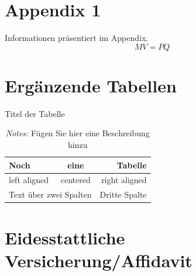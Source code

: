 \documentclass[a4paper,12pt]{scrartcl} %
\begin{document}

\clearpage


  \label{sec:literatur}                                 %
\onehalfspacing


\printbibliography %



\clearpage
\appendix
{} %

\section{Appendix 1}

Informationen präsentiert im Appendix.
\begin{equation}
    MV=PQ
\end{equation}

\clearpage

\section{Ergänzende Tabellen}


\begin{table}[h!] %
\caption{Titel der Tabelle}
\label{tab:SuppTable1}
\centering
 \begin{tabular}{lcr}
   Noch & eine & Tabelle\\
\toprule
   left aligned & centered & right aligned \\
   \multicolumn{2}{c}{Text über zwei Spalten} & Dritte Spalte \\
\bottomrule
\end{tabular}
\caption*{\footnotesize{\emph{Notes:} Fügen Sie hier eine Beschreibung hinzu}}
\end{table}

\clearpage

\section{Eidesstattliche Versicherung/Affidavit}
\end{document}
